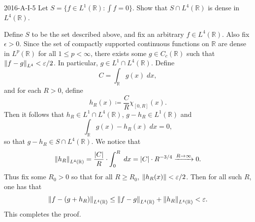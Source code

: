 \documentclass{article}
\begin{document}
	\begin{prb}{2016-A-I-5}
		Let $S = \{f \in L^1(\mathbb{R}): \int f = 0\}$. Show that $S \cap L^4(\mathbb{R})$ is dense in $L^4(\mathbb{R})$. 
	\end{prb}
	Define $S$ to be the set described above, and fix an arbitrary $f \in L^{4}(\mathbb{R})$. Also fix $\epsilon > 0$. Since the set of compactly supported continuous functions on $\mathbb{R}$ are dense in $L^{p}(\mathbb{R})$ for all $1  \leq p < \infty$, there exists some $g \in C_{c}(\mathbb{R})$ such that $\left\Vert f - g \right\Vert_{L^{4}} < \varepsilon/2$. In particular, $g \in L^1 \cap L^{4}(\mathbb{R})$. Define 
	\begin{equation*}
		C = \int_{\mathbb{R}}g(x)\;dx, 
	\end{equation*}
	and for each $R > 0$, define 
	\begin{equation*}
		h_{R}(x) \coloneqq \frac{C}{R}\chi_{[0,R]}(x). 
	\end{equation*}
	Then it follows that $h_{R} \in L^{1} \cap L^{4}(\mathbb{R})$, $g - h_{R} \in L^1(\mathbb{R})$ and 
	\begin{equation*}
		\int_{\mathbb{R}}g(x) - h_{R}(x)\;dx = 0, 
	\end{equation*}
	so that $g - h_{R} \in S \cap L^{4}(\mathbb{R})$. We notice that 
	\begin{equation*}
		\left\Vert h_{R} \right\Vert_{L^{4}(\mathbb{R})} = \frac{|C|}{R} \cdot \int_{0}^{R}\;dx = |C| \cdot R^{-3/4} \xrightarrow{R \to \infty} 0. 
	\end{equation*}
	Thus fix some $R_0 > 0$ so that for all $R \geq R_0$, $\left\Vert h_{R}(x) \right\Vert < \varepsilon/2$. Then for all such $R$, one has that 
	\begin{equation*}
		\left\Vert f - (g + h_{R}) \right\Vert_{L^{4}(\mathbb{R})} \leq \left\Vert f - g \right\Vert_{L^{4}(\mathbb{R})} + \left\Vert h_{R} \right\Vert_{L^{4}(\mathbb{R})} < \varepsilon. 
	\end{equation*}
	This completes the proof. 
	
\end{document}
